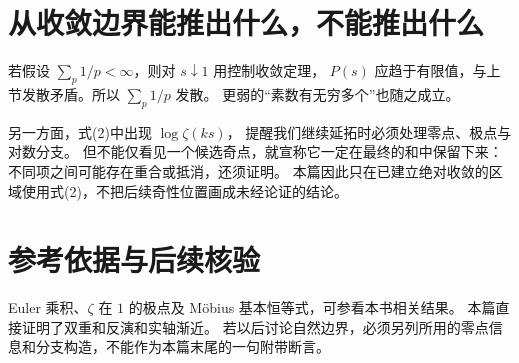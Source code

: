 \documentclass[UTF8,fontset=fandol,11pt]{ctexart}
\begin{document}
\section{从收敛边界能推出什么，不能推出什么}
若假设 $\sum_p1/p<\infty$，则对 $s\downarrow1$ 用控制收敛定理，
$P(s)$ 应趋于有限值，与上节发散矛盾。所以
$\sum_p1/p$ 发散。
更弱的“素数有无穷多个”也随之成立。

另一方面，式(2)中出现 $\log\zeta(ks)$，
提醒我们继续延拓时必须处理零点、极点与对数分支。
但不能仅看见一个候选奇点，就宣称它一定在最终的和中保留下来：
不同项之间可能存在重合或抵消，还须证明。
本篇因此只在已建立绝对收敛的区域使用式(2)，不把后续奇性位置画成未经论证的结论。

\section*{参考依据与后续核验}
Euler 乘积、$\zeta$ 在 $1$ 的极点及 Möbius 基本恒等式，可参看本书相关结果。
本篇直接证明了双重和反演和实轴渐近。
若以后讨论自然边界，必须另列所用的零点信息和分支构造，不能作为本篇末尾的一句附带断言。
\end{document}
